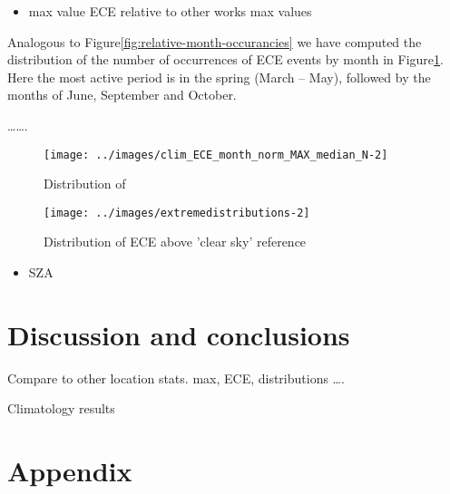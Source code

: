 \documentclass[preprint, 3p,
authoryear]{elsarticle} %
\providecommand{\tightlist}{%
  \setlength{\itemsep}{0pt}\setlength{\parskip}{0pt}}
\begin{document}
\begin{itemize}
\tightlist
\item
  max value ECE relative to other works max values
\end{itemize}

Analogous to Figure\nobreakspace{}\ref{fig:relative-month-occurancies}
we have computed the distribution of the number of occurrences of ECE
events by month in
Figure\nobreakspace{}\ref{fig:relative-month-occurancies-ECE}. Here the
most active period is in the spring (March -- May), followed by the
months of June, September and October.

\ldots\ldots.

\begin{figure}

{\centering \texttt{[image: ../images/clim\_ECE\_month\_norm\_MAX\_median\_N-2]} 

}

\caption{Distribution of }\label{fig:relative-month-occurancies-ECE}
\end{figure}

\begin{figure}

{\centering \texttt{[image: ../images/extremedistributions-2]} 

}

\caption{Distribution of ECE above 'clear sky' reference}\label{fig:unnamed-chunk-4}
\end{figure}

\begin{itemize}
\tightlist
\item
  SZA
\end{itemize}

\hypertarget{discussion-and-conclusions}{%
\section{Discussion and conclusions}\label{discussion-and-conclusions}}

Compare to other location stats. max, ECE, distributions \ldots.

Climatology results

\hypertarget{appendix}{%
\section*{Appendix}\label{appendix}}


\end{document}
